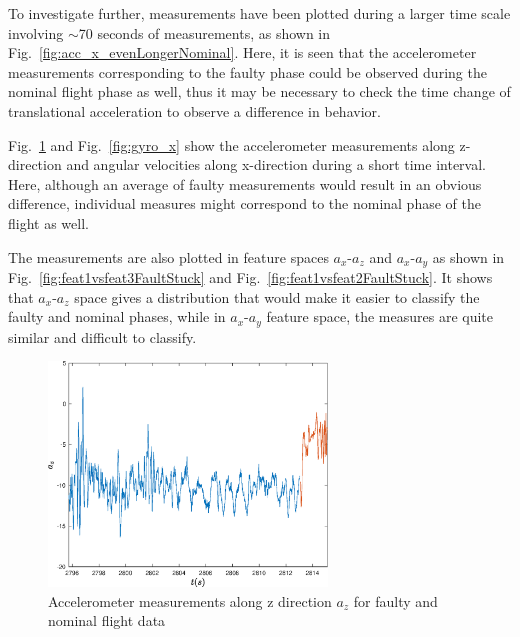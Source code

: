 



To investigate further, measurements have been plotted during a larger time scale involving $\sim$70 seconds of measurements, as shown in Fig.~\ref{fig:acc_x_evenLongerNominal}. 
Here, it is seen that the accelerometer measurements corresponding to the faulty phase could be observed during the nominal flight phase as well, thus it may be necessary to check the time change of translational acceleration to observe a difference in behavior. 

Fig.~\ref{fig:acc_z} and Fig.~\ref{fig:gyro_x} show the accelerometer measurements along z-direction and angular velocities along x-direction during a short time interval. 
Here, although an average of faulty measurements would result in an obvious difference, individual measures might correspond to the nominal phase of the flight as well.

The measurements are also plotted in feature spaces $a_x$-$a_z$ and $a_x$-$a_y$ as shown in Fig.~\ref{fig:feat1vsfeat3FaultStuck} and Fig.~\ref{fig:feat1vsfeat2FaultStuck}. 
It shows that $a_x$-$a_z$ space gives a distribution that would make it easier to classify the faulty and nominal phases, while in $a_x$-$a_y$ feature space, the measures are quite similar and difficult to classify.


\begin{figure}[H]
\begin{center}
\includegraphics[width=0.66\textwidth]{figures/acc_z}    %
\caption{Accelerometer measurements along z direction $a_z$ for faulty and nominal flight data} 
\label{fig:acc_z}
\end{center}
\end{figure}

